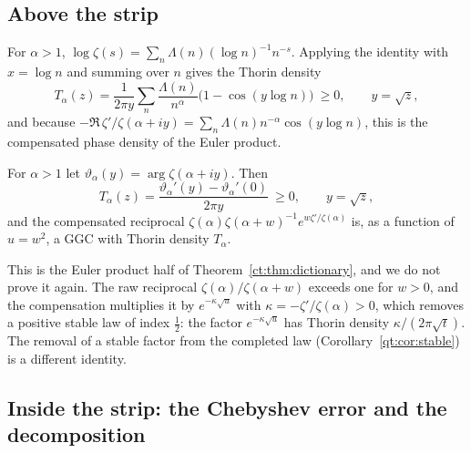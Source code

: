 \subsection{Above the strip}

For $\alpha>1$, $\log\zeta(s)=\sum_n\Lambda(n)(\log n)^{-1}n^{-s}$. Applying the identity with $x=\log n$ and summing over $n$ gives the Thorin density
\[
T_\alpha(z)=\frac1{2\pi y}\sum_n\frac{\Lambda(n)}{n^\alpha}\big(1-\cos(y\log n)\big)\ \ge0,\qquad y=\sqrt z,
\]
and because $-\Re\,\zeta'/\zeta(\alpha+iy)=\sum_n\Lambda(n)n^{-\alpha}\cos(y\log n)$, this is the compensated phase density of the Euler product.

\begin{proposition}\label{qt:prop:phase}
For $\alpha>1$ let $\vartheta_\alpha(y)=\arg\zeta(\alpha+iy)$. Then
\[
T_\alpha(z)=\frac{\vartheta_\alpha'(y)-\vartheta_\alpha'(0)}{2\pi y}\ \ge0,\qquad y=\sqrt z,
\]
and the compensated reciprocal $\zeta(\alpha)\zeta(\alpha+w)^{-1}e^{w\zeta'/\zeta(\alpha)}$ is, as a function of $u=w^2$, a GGC with Thorin density $T_\alpha$.
\end{proposition}

This is the Euler product half of Theorem~\ref{ct:thm:dictionary}, and we do not prove it again. The raw reciprocal $\zeta(\alpha)/\zeta(\alpha+w)$ exceeds one for $w>0$, and the compensation multiplies it by $e^{-\kappa\sqrt u}$ with $\kappa=-\zeta'/\zeta(\alpha)>0$, which removes a positive stable law of index $\tfrac12$: the factor $e^{-\kappa\sqrt u}$ has Thorin density $\kappa/(2\pi\sqrt t)$. The removal of a stable factor from the completed law (Corollary~\ref{qt:cor:stable}) is a different identity.

\subsection{Inside the strip: the Chebyshev error and the decomposition}

